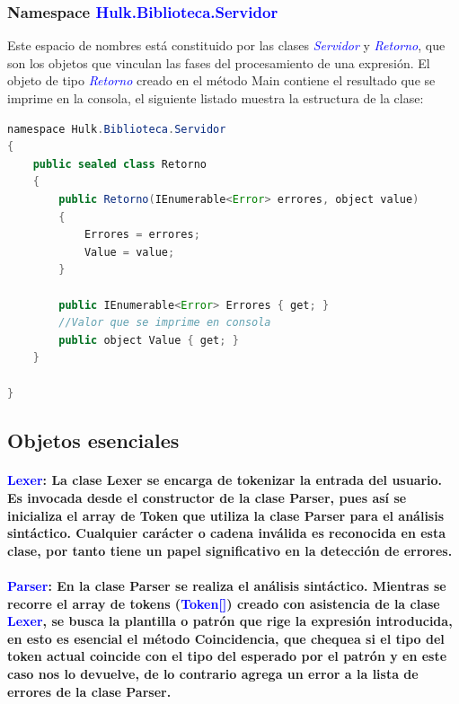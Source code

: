 \documentclass[a4paper, 12pt]{article}
\begin{document}
\subsubsection{Namespace \textcolor{blue}{Hulk.Biblioteca.Servidor}}
Este espacio de nombres está constituido por las clases  \textit{\textcolor{blue}{Servidor}} y  \textit{\textcolor{blue}{Retorno}}, que son los objetos que vinculan las fases del procesamiento de una expresión. El objeto de tipo  \textit{\textcolor{blue}{Retorno}} creado en el método Main contiene el resultado que se imprime en la consola,  el siguiente listado muestra la estructura de la clase:
\begin{lstlisting}[language= Java]
namespace Hulk.Biblioteca.Servidor
{
    public sealed class Retorno
    {
        public Retorno(IEnumerable<Error> errores, object value)
        {
            Errores = errores;
            Value = value;
        }

        public IEnumerable<Error> Errores { get; }
        //Valor que se imprime en consola
        public object Value { get; }
    }

}
\end{lstlisting}

\subsection{Objetos esenciales}\label{}
\paragraph{\textcolor{blue}{Lexer}: La clase Lexer se encarga de tokenizar la entrada del usuario. Es invocada desde el constructor de la clase Parser, pues así se inicializa el array de Token que utiliza la clase Parser para el análisis sintáctico. Cualquier carácter o cadena inválida es reconocida en esta clase, por tanto tiene un papel significativo en la detección de errores. }\label{}
\paragraph{\textcolor{blue}{Parser}: En la clase Parser se realiza el análisis sintáctico. Mientras se recorre el array de tokens (\textcolor{blue}{Token[]}) creado con asistencia de la clase \textcolor{blue}{Lexer}, se busca la plantilla o patrón que rige la expresión introducida, en esto es esencial el método Coincidencia, que chequea si el tipo del token actual coincide con el tipo del esperado por el patrón y en este caso nos lo devuelve, de lo contrario agrega un error a la lista de errores de la clase Parser. }\label{}
\end{document}
